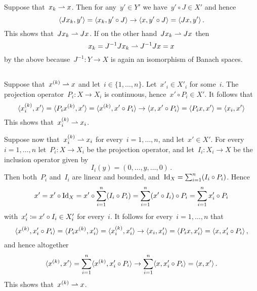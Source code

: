 \section{}





\subsection{}

Suppose that~$x_k \rightharpoonup x$.
Then for any~$y' \in Y'$ we have~$y' \circ J \in X'$ and hence
\[
      \langle J x_k, y' \rangle
  =   \langle x_k, y' \circ J\rangle
  \to \langle x, y' \circ J\rangle
  =   \langle J x, y'\rangle \,.
\]
This shows that~$J x_k \rightharpoonup J x$.
If on the other hand~$J x_k \rightharpoonup J x$ then
\[
        x_k
  =     J^{-1} J x_k
  \rightharpoonup  J^{-1} J x
  =     x
\]
by the above because~$J^{-1} \colon Y \to X$ is again an isomorphism of Banach spaces.





\subsection{}

Suppose that~$x^{(k)} \rightharpoonup x$ and let~$i \in \{1, \dotsc, n\}$.
Let~$x'_i \in X'_i$ for some~$i$.
The projection operator~$P_i \colon X \to X_i$ is continuous, hence~$x' \circ P_i \in X'$.
It follows that
\[
      \langle x^{(k)}_i, x' \rangle
  =   \langle P_i x^{(k)}, x' \rangle
  =   \langle x^{(k)}, x' \circ P_i \rangle
  \to \langle x, x' \circ P_i \rangle
  =   \langle P_i x, x' \rangle
  =   \langle x_i, x' \rangle
\]
This shows that~$x^{(k)}_i \rightharpoonup x_i$.

Suppose now that~$x^{(k)}_i \rightharpoonup x_i$ for every~$i = 1, \dotsc, n$, and let~$x' \in X'$.
For every~$i = 1, \dotsc, n$ let~$P_i \colon X \to X_i$ be the projection operator, and let~$I_i \colon X_i \to X$ be the inclusion operator given by
\[
    I_i(y)
  = (0, \dotsc, y, \dotsc, 0) \,.
\]
Then both~$P_i$ and~$I_i$ are linear and bounded, and~$\operatorname{Id}_X = \sum_{i=1}^n (I_i \circ P_i)$.
Hence
\[
    x'
  = x' \circ \operatorname{Id}_X
  = x' \circ \sum_{i=1}^n (I_i \circ P_i)
  = \sum_{i=1}^n (x' \circ I_i) \circ P_i
  = \sum_{i=1}^n x'_i \circ P_i
\]
with~$x'_i \coloneqq x' \circ I_i \in X'_i$ for every~$i$.
It follows for every~$i = 1, \dotsc, n$ that
\[
      \langle x^{(k)}, x'_i \circ P_i\rangle
  =   \langle P_i x^{(k)}, x'_i\rangle
  =   \langle x^{(k)}_i, x'_i\rangle
  \to \langle x_i, x'_i \rangle
  =   \langle P_i x, x'_i \rangle
  =   \langle x, x'_i \circ P_i \rangle \,,
\]
and hence altogether
\[
      \langle x^{(k)}, x' \rangle
  =   \sum_{i=1}^n \langle x^{(k)}, x'_i \circ P_i \rangle
  \to \sum_{i=1}^n \langle x, x'_i \circ P_i \rangle
  =   \langle x, x' \rangle \,.
\]
This shows that~$x^{(k)} \rightharpoonup x$.





